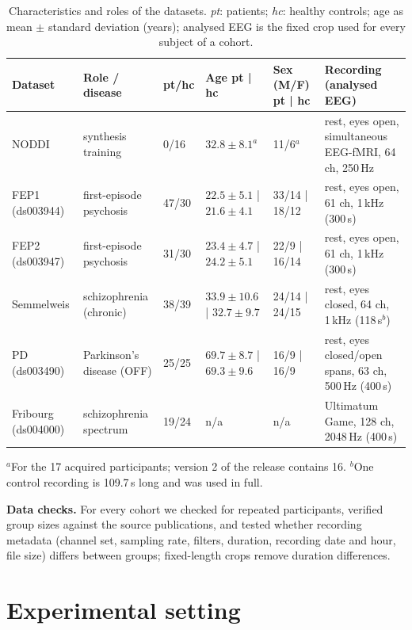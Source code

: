 \documentclass{article}
\begin{document}
\begin{table}[t]
    \centering
    \caption{Characteristics and roles of the datasets. \textit{pt}: patients; \textit{hc}: healthy controls; age as mean $\pm$ standard deviation (years); analysed EEG is the fixed crop used for every subject of a cohort.}
    \label{tab:data_description}
    \small
    \begin{tabular}{p{1.9cm} | p{2.2cm} | p{0.9cm} | p{2.4cm} | p{1.6cm} | p{3.6cm}}
        \hline
        \hline
         \hfil Dataset & \hfil Role / disease & \hfil pt/hc & \hfil Age pt | hc & \hfil Sex (M/F) pt | hc & \hfil Recording (analysed EEG) \\
         \hline
         NODDI & synthesis training & 0/16 & \hfil $32.8\pm8.1^{a}$ & \hfil 11/6$^{a}$ & rest, eyes open, simultaneous EEG-fMRI, 64 ch, 250\,Hz \\
         FEP1 (ds003944) & first-episode psychosis & 47/30 & $22.5\pm5.1$ | $21.6\pm4.1$ & 33/14 | 18/12 & rest, eyes open, 61 ch, 1\,kHz (300\,s) \\
         FEP2 (ds003947) & first-episode psychosis & 31/30 & $23.4\pm4.7$ | $24.2\pm5.1$ & 22/9 | 16/14 & rest, eyes open, 61 ch, 1\,kHz (300\,s) \\
         Semmelweis & schizophrenia (chronic) & 38/39 & $33.9\pm10.6$ | $32.7\pm9.7$ & 24/14 | 24/15 & rest, eyes closed, 64 ch, 1\,kHz (118\,s$^{b}$) \\
         PD (ds003490) & Parkinson's disease (OFF) & 25/25 & $69.7\pm8.7$ | $69.3\pm9.6$ & 16/9 | 16/9 & rest, eyes closed/open spans, 63 ch, 500\,Hz (400\,s) \\
         Fribourg (ds004000) & schizophrenia spectrum & 19/24 & n/a & n/a & Ultimatum Game, 128 ch, 2048\,Hz (400\,s) \\
         \hline
         \hline
    \end{tabular}

    \raggedright\footnotesize $^{a}$For the 17 acquired participants; version 2 of the release contains 16. $^{b}$One control recording is 109.7\,s long and was used in full.
\end{table}

\noindent\textbf{Data checks.} For every cohort we checked for repeated participants, verified group sizes against the source publications, and tested whether recording metadata (channel set, sampling rate, filters, duration, recording date and hour, file size) differs between groups; fixed-length crops remove duration differences.

\section{Experimental setting}\label{section:setting}\vskip0.2cm
\end{document}
